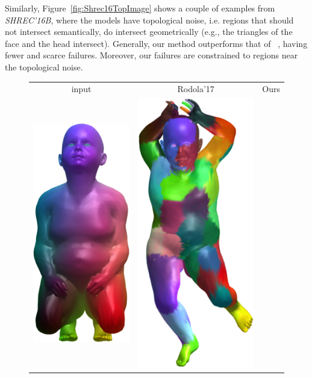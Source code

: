 Similarly, Figure~\ref{fig:Shrec16TopImage} shows a couple of examples from {\em SHREC'16B}, where the models have topological noise, i.e. regions that should not intersect semantically, do intersect geometrically (e.g., the triangles of the face and the head intersect).
Generally, our method outperforms that of ~\cite{rodola2017partial}, having fewer and scarce failures.
Moreover, our failures are constrained to regions near the topological noise.
\begin{figure}[h!]
	\centering
	\begin{tabular}{ccc}
		input  & Rodola'17\cite{rodola2017partial} & Ours \\
		\includegraphics[scale=0.4]{figures/Top2Base.png} &
		\includegraphics[scale=0.4]{figures/Top2PFM.png} &

\end{tabular}
\end{figure}
